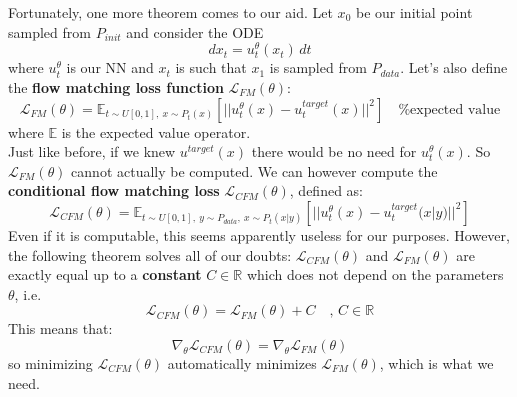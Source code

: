 Fortunately, one more theorem comes to our aid. Let $x_0$ be our initial point sampled from $P_{init}$ and consider the ODE 
\begin{equation*}
    dx_t = u_t^\theta(x_t) \,dt   
\end{equation*}
where $u_t^\theta$ is our NN and $x_t$ is such that $x_1$ is sampled from $P_{data}$. Let's also define the \textbf{flow matching loss function} $\mathcal{L}_{FM}(\theta)$:
\begin{equation}
    \mathcal{L}_{FM}(\theta) = \mathbb{E}_{t \sim U[0,1], \ x \sim P_t(x)} \left[ ||u_t^\theta(x) - u_t^{target}(x)||^2 \right] \quad \text{\% expected value}
\end{equation}
where $\mathbb{E}$ is the expected value operator. \\
Just like before, if we knew $u^{target}(x)$ there would be no need for $u_t^\theta(x)$. So $\mathcal{L}_{FM}(\theta)$ cannot actually be computed. We can however compute the \textbf{conditional flow matching loss} $\mathcal{L}_{CFM}(\theta)$, defined as:
\begin{equation}
    \mathcal{L}_{CFM}(\theta) = \mathbb{E}_{t \sim U[0,1], \ y \sim P_{data}, \ x \sim P_t(x|y)} \left[ ||u_t^\theta(x) - u_t^{target}(x|y)||^2 \right]
\end{equation}
Even if it is computable, this seems apparently useless for our purposes. However, the following theorem solves all of our doubts: $\mathcal{L}_{CFM}(\theta)$ and $\mathcal{L}_{FM}(\theta)$ are exactly equal up to a \textbf{constant} $C \in \mathbb{R}$ which does not depend on the parameters $\theta$, i.e.
\begin{equation}
    \mathcal{L}_{CFM}(\theta) = \mathcal{L}_{FM}(\theta) + C \quad \text{, } C \in \mathbb{R}
\end{equation}
This means that:
\begin{equation}
    \nabla_\theta \mathcal{L}_{CFM}(\theta) = \nabla_\theta \mathcal{L}_{FM}(\theta)
\end{equation}
so minimizing $\mathcal{L}_{CFM}(\theta)$ automatically minimizes $\mathcal{L}_{FM}(\theta)$, which is what we need.

